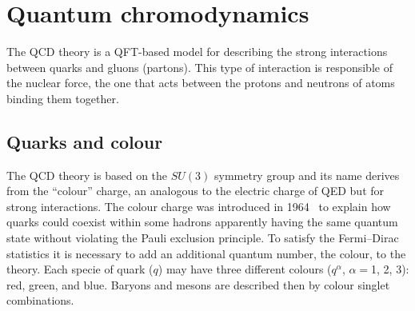 





\section{Quantum chromodynamics}
\label{sec:chap1:QCD}
The QCD theory is a QFT-based model for describing the strong interactions between 
quarks and gluons (partons). This type of interaction is responsible of 
the nuclear force, the one that acts between the protons and neutrons of atoms 
binding them together. %

\subsection{Quarks and colour}%

The QCD theory is based on the $SU(3)$ symmetry group and its name derives from the ``colour'' charge, an analogous to the electric charge of QED but for strong interactions.
The colour charge was introduced in 1964~\cite{Greenberg:1964pe} to explain how quarks could coexist within some hadrons apparently having the same 
quantum state without violating the Pauli exclusion principle. To satisfy the Fermi--Dirac statistics it is necessary to add an additional quantum number, the
colour, to the theory. Each specie of quark ($q$) may have three different colours ($q^{\alpha}$, $\alpha=$1, 2, 3): red, green, and blue.
Baryons and mesons are described then by colour singlet combinations.%

